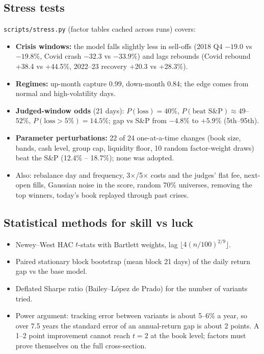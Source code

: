 \documentclass[11pt]{article}
\newcommand{\code}[1]{\texttt{#1}}
\begin{document}
\subsection{Stress tests}
\code{scripts/stress.py} (factor tables cached across runs) covers:
\begin{itemize}
\item \textbf{Crisis windows:} the model falls slightly less in sell-offs (2018 Q4 $-19.0$ vs $-19.8\%$, Covid crash
$-32.3$ vs $-33.9\%$) and lags rebounds (Covid rebound +38.4 vs +44.5\%, 2022--23 recovery +20.3 vs +28.3\%).
\item \textbf{Regimes:} up-month capture 0.99, down-month 0.84; the edge comes from normal and high-volatility days.
\item \textbf{Judged-window odds} (21 days): $P(\text{loss})=40\%$, $P(\text{beat S\&P})\approx 49$--$52\%$,
$P(\text{loss}>5\%)=14.5\%$; gap vs S\&P from $-4.8\%$ to $+5.9\%$ (5th--95th).
\item \textbf{Parameter perturbations:} 22 of 24 one-at-a-time changes (book size, bands, cash level, group cap,
liquidity floor, 10 random factor-weight draws) beat the S\&P (12.4\% -- 18.7\%); none was adopted.
\item Also: rebalance day and frequency, 3$\times$/5$\times$ costs and the judges' flat fee, next-open fills, Gaussian
noise in the score, random 70\% universes, removing the top winners, today's book replayed through past crises.
\end{itemize}

\subsection{Statistical methods for skill vs luck}
\begin{itemize}
\item Newey--West HAC $t$-stats with Bartlett weights, lag $\lfloor 4(n/100)^{2/9}\rfloor$.
\item Paired stationary block bootstrap (mean block 21 days) of the daily return gap vs the base model.
\item Deflated Sharpe ratio (Bailey--L\'opez de Prado) for the number of variants tried.
\item Power argument: tracking error between variants is about 5--6\% a year, so over 7.5 years the standard error of
an annual-return gap is about 2 points. A 1--2 point improvement cannot reach $t=2$ at the book level; factors must prove
themselves on the full cross-section.
\end{itemize}
\end{document}
